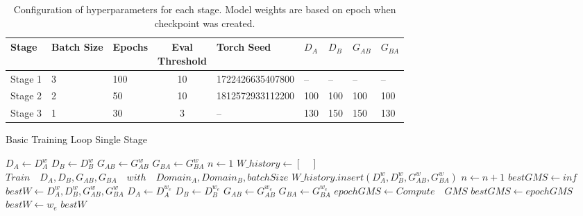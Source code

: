 \documentclass[twoside,english,notitlepage]{report}
\begin{document}
\begin{table}[h]
    \centering
    \begin{tabular}{|l|l|l|c|l|l|l|l|l|}
    \hline
    \textbf{Stage} & \textbf{Batch Size} & \textbf{Epochs} & \makecell{\textbf{Eval} \\ \textbf{Threshold}} & \textbf{Torch Seed} & \textbf{$D_A$} & \textbf{$D_B$} & \textbf{$G_{AB}$} & {$G_{BA}$} \\
    \hline
    Stage 1 & 3 & 100 & 10 & 1722426635407800 & -- & -- & -- & -- \\
    Stage 2 & 2 & 50  & 10 & 1812572933112200 & 100 & 100 & 100 & 100 \\
    Stage 3 & 1 & 30  & 3  & --               & 130 & 150 & 150 & 130 \\
    \hline
    \end{tabular}
    \caption{Configuration of hyperparameters for each stage. Model weights are based on epoch when checkpoint was created.}
\end{table}

\begin{algorithm}[h]
    \caption{Basic Training Loop Single Stage}\label{alg:cap}
    \begin{algorithmic}
     
        \State $D_{A} \gets D^w_{A}$
        \State $D_{B} \gets D^w_{B}$
        \State $G_{AB} \gets G^w_{AB}$
        \State $G_{BA} \gets G^w_{BA}$
        \State $n \gets 1$
        \State $W\_history \gets [\quad]$
            \State$Train \quad D_{A}, D_{B}, G_{AB}, G_{BA} \quad with \quad Domain_A, Domain_B, batchSize$
                \State $W\_history.insert({D^w_{A}, D^w_{B}, G^w_{AB}, G^w_{BA}})$
            \EndIf
            \State $n \gets n + 1$
        \EndWhile
        \State $bestGMS \gets inf$
        \State $bestW \gets {D^w_{A}, D^w_{B}, G^w_{AB}, G^w_{BA}}$
         
            \State $D_{A} \gets D^{w_{e}}_{A}$
            \State $D_{B} \gets D^{w_{e}}_{B}$
            \State $G_{AB} \gets G^{w_{e}}_{AB}$
            \State $G_{BA} \gets G^{w_{e}}_{BA}$
            \State $epochGMS \gets Compute \quad GMS$
                \State $bestGMS \gets epochGMS$
                \State $bestW \gets w_{e}$
            \EndIf
        \EndFor
        \State \Return $bestW$ 
    \EndProcedure
    \end{algorithmic}
\end{algorithm}
\end{document}
